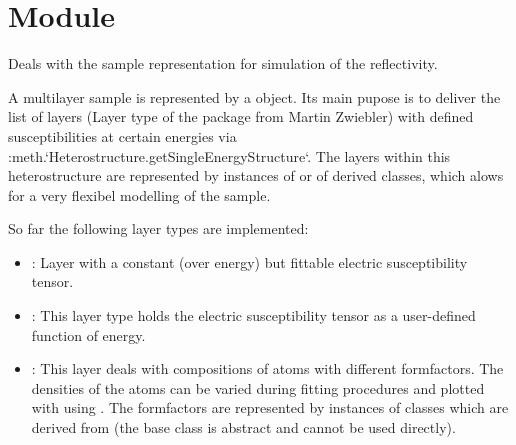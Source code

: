 \documentclass[letterpaper,10pt,english]{sphinxmanual}
\begin{document}
\section{Module }
\label{\detokenize{modules-api/samplerepresentation:module-SampleRepresentation}}\label{\detokenize{modules-api/samplerepresentation:module-samplerepresentation}}\label{\detokenize{modules-api/samplerepresentation::doc}}
Deals with the sample representation for simulation of the reflectivity.

A multilayer sample is represented by a {\hyperref[\detokenize{modules-api/samplerepresentation:SampleRepresentation.Heterostructure}]{}} object. Its main pupose is to deliver the list of layers (Layer type of the  package from Martin Zwiebler) with defined susceptibilities at certain energies via :meth.{}`Heterostructure.getSingleEnergyStructure{}`. The layers within this heterostructure are represented by instances of {\hyperref[\detokenize{modules-api/samplerepresentation:SampleRepresentation.LayerObject}]{}} or of derived classes, which alows for a very flexibel modelling of the sample.

So far the following layer types are implemented:
\begin{itemize}
\item {} 
{\hyperref[\detokenize{modules-api/samplerepresentation:SampleRepresentation.LayerObject}]{}}: Layer with a constant (over energy) but fittable electric susceptibility tensor.

\item {} 
{\hyperref[\detokenize{modules-api/samplerepresentation:SampleRepresentation.ModelChiLayerObject}]{}}: This layer type holds the electric susceptibility tensor as a user-defined function of energy.

\item {} 
{\hyperref[\detokenize{modules-api/samplerepresentation:SampleRepresentation.AtomLayerObject}]{}}: This layer deals with compositions of atoms with different formfactors. The densities of the atoms can be varied during fitting procedures and plotted with using {\hyperref[\detokenize{modules-api/samplerepresentation:SampleRepresentation.plotAtomDensity}]{}}. The formfactors are represented by instances of classes which are derived from {\hyperref[\detokenize{modules-api/samplerepresentation:SampleRepresentation.Formfactor}]{}} (the base class is abstract and cannot be used directly).

\end{itemize}
\end{document}
